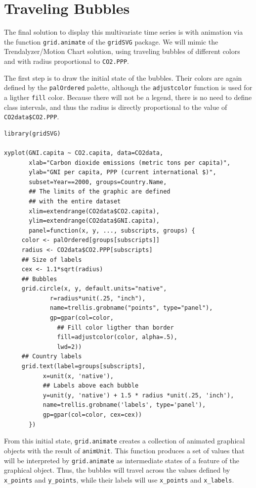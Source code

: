 \section{\floweroneleft Traveling Bubbles}
\label{sec-6}
The final solution to display this multivariate time series is with
animation via the function \texttt{grid.animate} of the \texttt{gridSVG}
package. We will mimic the Trendalyzer/Motion Chart solution, using
traveling bubbles of different colors and with radius proportional to
\texttt{CO2.PPP}.

The first step is to draw the initial state of the bubbles. Their
colors are again defined by the \texttt{palOrdered} palette, although the
\texttt{adjustcolor} function is used for a ligther \texttt{fill} color. Because
there will not be a legend, there is no need to define class
intervals, and thus the radius is directly proportional to the value
of \texttt{CO2data\$CO2.PPP}.


\lstset{language=R,numbers=none}
\begin{lstlisting}
library(gridSVG)

xyplot(GNI.capita ~ CO2.capita, data=CO2data,
       xlab="Carbon dioxide emissions (metric tons per capita)",
       ylab="GNI per capita, PPP (current international $)",
       subset=Year==2000, groups=Country.Name,
       ## The limits of the graphic are defined
       ## with the entire dataset
       xlim=extendrange(CO2data$CO2.capita),
       ylim=extendrange(CO2data$GNI.capita),
       panel=function(x, y, ..., subscripts, groups) {
	 color <- palOrdered[groups[subscripts]]
	 radius <- CO2data$CO2.PPP[subscripts]
	 ## Size of labels
	 cex <- 1.1*sqrt(radius)
	 ## Bubbles
	 grid.circle(x, y, default.units="native",
		     r=radius*unit(.25, "inch"),
		     name=trellis.grobname("points", type="panel"),
		     gp=gpar(col=color,
		       ## Fill color ligther than border
		       fill=adjustcolor(color, alpha=.5),
		       lwd=2))
	 ## Country labels
	 grid.text(label=groups[subscripts],
		   x=unit(x, 'native'),
		   ## Labels above each bubble
		   y=unit(y, 'native') + 1.5 * radius *unit(.25, 'inch'),
		   name=trellis.grobname('labels', type='panel'),
		   gp=gpar(col=color, cex=cex))
       })
\end{lstlisting}

From this initial state, \texttt{grid.animate} creates a collection of
animated graphical objects with the result of \texttt{animUnit}. This
function produces a set of values that will be interpreted by
\texttt{grid.animate} as intermediate states of a feature of the graphical
object. Thus, the bubbles will travel across the values defined by
\texttt{x\_points} and \texttt{y\_points}, while their labels will use \texttt{x\_points} and
\texttt{x\_labels}.

